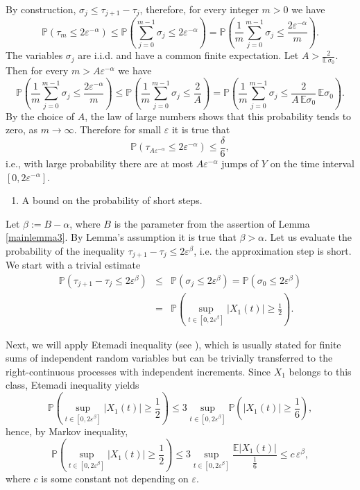 \documentclass[12pt]{article}
\let\al\alpha
\let\de\delta
\newcommand{\E}{\mathbb{E}}
\let\ep\varepsilon
\newcommand{\prob}{\mathbb{P}}
\let\le\leqslant
\let\ge\geqslant
\theoremstyle{definition}
\begin{document}
By construction, $\sigma_j\le \tau_{j+1} - \tau_j$, therefore, for every integer $m>0$ 
we have  
\begin{equation*}
    \prob(\tau_m\le 2\ep^{-\alpha})
    \le \prob \left(\sum_{j=0}^{m-1}\sigma_j\le2\ep^{-\alpha}\right) 
    = \prob \left(\frac 1 m \sum_{j=0}^{m-1}\sigma_j\le \frac{2\ep^{-\alpha}}{m}\right).
\end{equation*}
The variables $\sigma_j$ are i.i.d. and have a common finite expectation. 
Let $A > \frac{2}{\E\, \sigma_0}$. Then for every  $m > A\ep^{-\al}$ we have    
\begin{equation*}
    \prob\left(\frac 1 m\sum_{j=0}^{m-1}\sigma_j\le \frac{2\ep^{-\alpha}}{m} \right) 
    \le
    \prob\left(\frac 1 m\sum_{j=0}^{m-1}\sigma_j\le \frac{2}{A} \right)
    =
     \prob\left(\frac 1 m\sum_{j=0}^{m-1}\sigma_j\le \frac{2}{A\, \E\sigma_0}\, \E\sigma_0 \right). 
\end{equation*}
By the choice of $A$, the law of large numbers shows that this probability tends to zero,
as $m\to\infty$. Therefore for small $\ep$ it is true that 
\begin{equation} \label{fewsteps}
    \prob(\tau_{A\ep^{-\alpha}} \le 2\ep^{-\alpha}) 
    \le \frac{\de}{6}, 
\end{equation}
i.e., with large probability there are at most  $A\ep^{-\alpha}$ jumps of $Y$ 
on the time interval $[0,2\ep^{-\alpha}]$.

\begin{enumerate}
    \item[3)] A bound on the probability of short steps. 
\end{enumerate}
Let $\beta:=B-\alpha$, where $B$ is the parameter from the assertion of Lemma \ref{mainlemma3}.  
By Lemma's assumption it is true that $\beta>\alpha$. 
Let us evaluate the probability of the inequality $\tau_{j+1} - \tau_j \le 2\ep^\beta$, 
i.e. the approximation step is short.
We start with a trivial estimate
\begin{eqnarray} \nonumber
            \prob(\tau_{j+1} - \tau_j \le 2\ep^\beta) 
       &\le& \prob(\sigma_j\le 2\ep^\beta) = \prob(\sigma_0 \le 2\ep^\beta) 
\\ \label{mainlemma2: short jump 1}
       &=& \prob \left(\sup_{t\in[0,2\ep^\beta]}|X_1(t)|\ge \frac12 \right).
\end{eqnarray}            


Next, we will apply Etemadi inequality (see \cite{Etemadi}), which is usually stated for finite sums of
independent random variables but can be trivially transferred to the right-continuous processes
with independent increments. Since $X_1$ belongs to this class, Etemadi inequality yields
\[
   \prob\left(\sup_{t\in[0,2\ep^\beta]}|X_1(t)| \ge \frac12\right)
   \le 3 \sup_{t\in[0,2\ep^\beta]} \prob \left(|X_1(t)|\ge \frac 16\right),
\]
hence, by Markov inequality,
\begin{equation}\label{mainlemma2: short jump 2}
    \prob \left(\sup_{t\in[0,2\ep^\beta]}|X_1(t)| \ge \frac12 \right)
    \le 3\sup_{t\in[0,2\ep^\beta]}\frac{\E|X_1(t)|}{\frac16} \le c\, \ep^\beta,
\end{equation}
where $c$ is some constant not depending on $\ep$.
        
\end{document}
